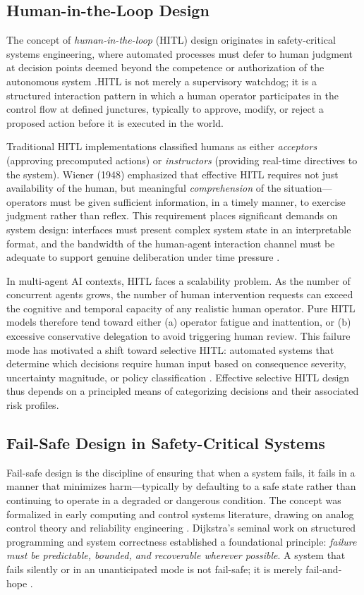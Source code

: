 \subsection{Human-in-the-Loop Design}

The concept of \emph{human-in-the-loop} (HITL) design originates in safety-critical systems engineering, where automated processes must defer to human judgment at decision points deemed beyond the competence or authorization of the autonomous system \cite{wiener1948}.HITL is not merely a supervisory watchdog; it is a structured interaction pattern in which a human operator participates in the control flow at defined junctures, typically to approve, modify, or reject a proposed action before it is executed in the world.

Traditional HITL implementations classified humans as either \emph{acceptors} (approving precomputed actions) or \emph{instructors} (providing real-time directives to the system). Wiener (1948) emphasized that effective HITL requires not just availability of the human, but meaningful \emph{comprehension} of the situation—operators must be given sufficient information, in a timely manner, to exercise judgment rather than reflex. This requirement places significant demands on system design: interfaces must present complex system state in an interpretable format, and the bandwidth of the human-agent interaction channel must be adequate to support genuine deliberation under time pressure \cite{tristr81}.

In multi-agent AI contexts, HITL faces a scalability problem. As the number of concurrent agents grows, the number of human intervention requests can exceed the cognitive and temporal capacity of any realistic human operator. Pure HITL models therefore tend toward either (a) operator fatigue and inattention, or (b) excessive conservative delegation to avoid triggering human review. This failure mode has motivated a shift toward selective HITL: automated systems that determine which decisions require human input based on consequence severity, uncertainty magnitude, or policy classification \cite{bansal2019}. Effective selective HITL design thus depends on a principled means of categorizing decisions and their associated risk profiles.

\subsection{Fail-Safe Design in Safety-Critical Systems}

Fail-safe design is the discipline of ensuring that when a system fails, it fails in a manner that minimizes harm—typically by defaulting to a safe state rather than continuing to operate in a degraded or dangerous condition. The concept was formalized in early computing and control systems literature, drawing on analog control theory and reliability engineering \cite{dijkstra1982}. Dijkstra's seminal work on structured programming and system correctness established a foundational principle: \emph{failure must be predictable, bounded, and recoverable wherever possible}. A system that fails silently or in an unanticipated mode is not fail-safe; it is merely fail-and-hope \cite{tristr81}.

